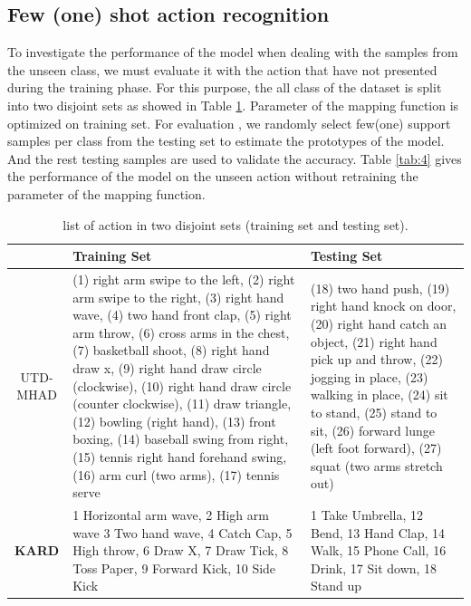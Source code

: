 \documentclass{bmvc2k}
\newcommand{\reftab}[1]{Table \ref{#1}}
\begin{document}
\subsection*{Few (one) shot action recognition}
To investigate the performance of the model when dealing with the samples from the unseen class, we must evaluate it with the action that have not presented during the training phase. For this purpose, the all class of the dataset is split into two disjoint sets as showed in \reftab{tab:3}. Parameter of the mapping function is optimized on training set. For evaluation , we randomly select few(one) support samples per class from the testing set to estimate the prototypes of the model. And the rest testing samples are used to validate the accuracy. \reftab{tab:4} gives the performance of the model on the unseen action without retraining the parameter of the mapping function. 
\begin{table}[htbp]
	\begin{center}
		\caption{ list of action in two disjoint sets (training set and testing set). }
		
		\begin{tabular}{|c|p{4.8cm}|p{4cm}|}
	
			\hline
			  & Training Set & Testing Set  \\
			\hline
			UTD-MHAD & (1) right arm swipe to the left, (2) right arm swipe to the right, (3) right hand wave, (4) two hand front clap, (5) right arm throw, (6) cross arms in the chest, (7) basketball shoot, (8) right hand draw x, (9) right hand draw circle (clockwise), (10) right hand draw circle (counter clockwise), (11) draw triangle, (12) bowling (right hand), (13) front boxing, (14) baseball swing from right, (15) tennis right hand forehand swing, (16) arm curl (two arms), (17) tennis serve & (18) two hand push, (19) right hand knock on door, (20) right hand catch an object, (21) right hand pick up and throw, (22) jogging in place, (23) walking in place, (24) sit to stand, (25) stand to sit, (26) forward lunge (left foot forward), (27) squat (two arms stretch out)\\
			\hline
			\bfseries{KARD} & 1 Horizontal arm wave, 2 High arm wave
			3 Two hand wave, 4 Catch Cap, 5 High throw, 6 Draw X, 7 Draw Tick, 8 Toss Paper, 9 Forward Kick, 10 Side Kick
			 & 1 Take Umbrella, 12 Bend, 13 Hand Clap, 14 Walk, 15 Phone Call, 16 Drink, 17 Sit down, 18 Stand up \\
			\hline
		\end{tabular}	
	\end{center}	
	\label{tab:3}
\end{table}
\end{document}
